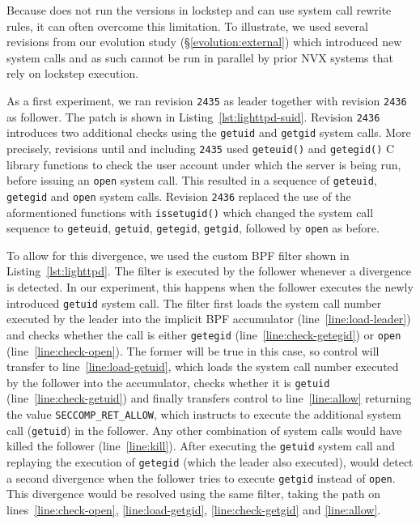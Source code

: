 Because \varan does not run the versions in lockstep and can use system call
rewrite rules, it can often overcome this limitation. To illustrate, we used
several \lighttpd revisions from our evolution study
(\S\ref{evolution:external}) which introduced new system calls and as such
cannot be run in parallel by prior NVX systems that rely on lockstep execution.

As a first experiment, we ran revision \lstinline`2435` as leader together with
revision \lstinline`2436` as follower. The patch is shown in
Listing~\ref{lst:lighttpd-suid}. Revision \lstinline`2436` introduces two
additional checks using the \lstinline`getuid` and \lstinline`getgid` system
calls.  More precisely, revisions until and including \lstinline`2435` used
\lstinline`geteuid()` and \lstinline`getegid()` C library functions to check
the user account under which the server is being run, before issuing an
\lstinline`open` system call.  This resulted in a sequence of
\lstinline`geteuid`, \lstinline`getegid` and \lstinline`open` system calls.
Revision \lstinline`2436` replaced the use of the aformentioned functions with
\lstinline`issetugid()` which changed the system call sequence to
\lstinline`geteuid`, \lstinline`getuid`, \lstinline`getegid`,
\lstinline`getgid`, followed by \lstinline`open` as before.

To allow for this divergence, we used the custom BPF filter shown in
Listing~\ref{lst:lighttpd}.  The filter is executed by the
follower whenever a divergence is detected.  In our experiment, this
happens when the follower executes the newly introduced
\lstinline`getuid` system call. The filter first loads the system call
number executed by the leader into the implicit BPF accumulator
(line~\ref{line:load-leader}) and checks whether the call is either
\lstinline`getegid` (line~\ref{line:check-getegid}) or
\lstinline`open` (line~\ref{line:check-open}).  The former will be
true in this case, so control will transfer to
line~\ref{line:load-getuid}, which loads the system call number
executed by the follower into the accumulator, checks whether it is
\lstinline`getuid` (line~\ref{line:check-getuid}) and finally
transfers control to line~\ref{line:allow} returning the value
\lstinline`SECCOMP_RET_ALLOW`, which instructs \varan to execute the
additional system call (\ie \lstinline`getuid`) in the follower.  Any
other combination of system calls would have killed the follower
(line~\ref{line:kill}). After executing the \lstinline`getuid` system
call and replaying the execution of \lstinline`getegid` (which the
leader also executed), \varan would detect a second divergence when
the follower tries to execute \lstinline`getgid` instead of
\lstinline`open`. This divergence would be resolved using the same
filter, taking the path on lines~\ref{line:check-open},
\ref{line:load-getgid}, \ref{line:check-getgid} and \ref{line:allow}.

